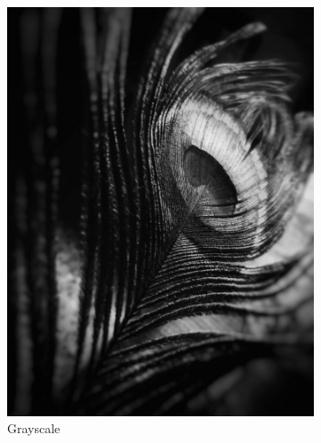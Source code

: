 \documentclass[a4paper]{article}
\begin{document}
\begin{figure}[H]
    \hfill
    \begin{subfigure}[b]{.225\textwidth}
        \centering
        \includegraphics[width=\textwidth]{output/feather_grayscale.jpg}
        \caption{Grayscale}
    \end{subfigure}
    \hfill
    \begin{subfigure}[b]{.225\textwidth}
        \centering

\end{subfigure}
\end{figure}
\end{document}

